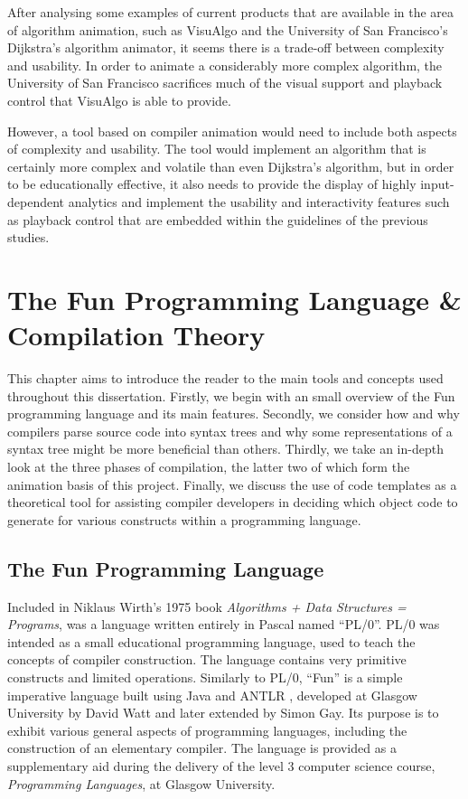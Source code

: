 \documentclass{l4proj}
\begin{document}
After analysing some examples of current products that are available in the area of algorithm animation, such as VisuAlgo and the University of San Francisco's Dijkstra's algorithm animator, it seems there is a trade-off between complexity and usability. In order to animate a considerably more complex algorithm, the University of San Francisco sacrifices much of the visual support and playback control that VisuAlgo is able to provide. 

However, a tool based on compiler animation would need to include both aspects of complexity and usability. The tool would implement an algorithm that is certainly more complex and volatile than even Dijkstra's algorithm, but in order to be educationally effective, it also needs to provide the display of highly input-dependent analytics and implement the usability and interactivity features such as playback control that are embedded within the guidelines of the previous studies.

\chapter{The Fun Programming Language \& Compilation Theory}
This chapter aims to introduce the reader to the main tools and concepts used throughout this dissertation. Firstly, we begin with an small overview of the Fun programming language and its main features. Secondly, we consider how and why compilers parse source code into syntax trees and why some representations of a syntax tree might be more beneficial than others. Thirdly, we take an in-depth look at the three phases of compilation, the latter two of which form the animation basis of this project. Finally, we discuss the use of code templates as a theoretical tool for assisting compiler developers in deciding which object code to generate for various constructs within a programming language.

\section{The Fun Programming Language}
Included in Niklaus Wirth's 1975 book {\it Algorithms + Data Structures = Programs}, was a language written entirely in Pascal named ``PL/0''. PL/0 was intended as a small educational programming language, used to teach the concepts of compiler construction. The language contains very primitive constructs and limited operations. Similarly to PL/0, ``Fun'' is a simple imperative language built using Java and ANTLR \cite{antlr}, developed at Glasgow University by David Watt and later extended by Simon Gay. Its purpose is to exhibit various general aspects of programming languages, including the construction of an elementary compiler. The language is provided as a supplementary aid during the delivery of the level 3 computer science course, {\it Programming Languages}, at Glasgow University.
\end{document}

